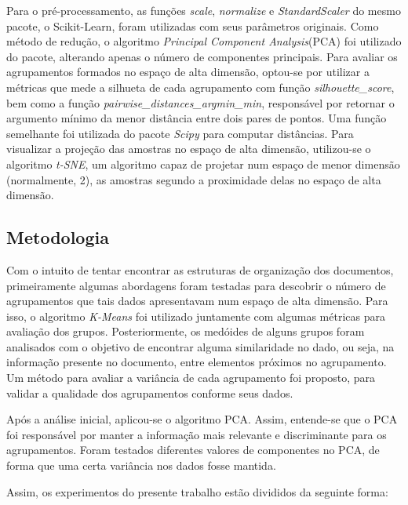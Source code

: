 \documentclass[conference]{IEEEtran}
\begin{document}
Para o pré-processamento, as funções \emph{scale}, \emph{normalize} e \emph{StandardScaler} do mesmo pacote, o Scikit-Learn, foram utilizadas com seus parâmetros originais. Como método de redução, o algoritmo \emph{Principal Component Analysis}(PCA) foi utilizado do pacote, alterando apenas o número de componentes principais. Para avaliar os agrupamentos formados no espaço de alta dimensão, optou-se por utilizar a métricas que mede a silhueta de cada agrupamento com função \emph{silhouette\_score}, bem como a função \emph{pairwise\_distances\_argmin\_min}, responsável por retornar o argumento mínimo da menor distância entre dois pares de pontos. Uma função semelhante foi utilizada do pacote \emph{Scipy} para computar distâncias. Para visualizar a projeção das amostras no espaço de alta dimensão, utilizou-se o algoritmo \emph{t-SNE}, um algoritmo capaz de projetar num espaço de menor dimensão (normalmente, 2), as amostras segundo a proximidade delas no espaço de alta dimensão.


\subsection{Metodologia} \label{sec:met}

Com o intuito de tentar encontrar as estruturas de organização dos documentos, primeiramente algumas abordagens foram testadas para descobrir o número de agrupamentos que tais dados apresentavam num espaço de alta dimensão. Para isso, o algoritmo \emph{K-Means} foi utilizado juntamente com algumas métricas para avaliação dos grupos. Posteriormente, os medóides de alguns grupos foram analisados com o objetivo de encontrar alguma similaridade no dado, ou seja, na informação presente no documento, entre elementos próximos no agrupamento. Um método para avaliar a variância de cada agrupamento foi proposto, para validar a qualidade dos agrupamentos conforme seus dados.

Após a análise inicial, aplicou-se o algoritmo PCA. Assim, entende-se que o PCA foi responsável por manter a informação mais relevante e discriminante para os agrupamentos. Foram testados diferentes valores de componentes no PCA, de forma que uma certa variância nos dados fosse mantida.

Assim, os experimentos do presente trabalho estão divididos da seguinte forma:
\end{document}
